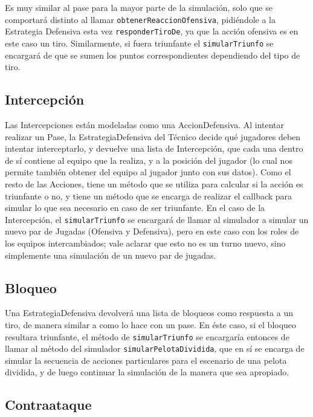 Es muy similar al pase para la mayor parte de la simulación, solo que se comportará distinto al llamar \texttt{obtenerReaccionOfensiva}, pidiéndole a la Estrategia Defensiva esta vez \texttt{responderTiroDe}, ya que la acción ofensiva es en este caso un tiro. Similarmente, si fuera triunfante el \texttt{simularTriunfo} se encargará de que se sumen los puntos correspondientes dependiendo del tipo de tiro.

\subsection{Intercepción}
Las Intercepciones están modeladas como una AccionDefensiva. Al intentar realizar un Pase, la EstrategiaDefensiva del Técnico decide qué jugadores deben intentar interceptarlo, y devuelve una lista de Intercepción, que cada una dentro de sí contiene al equipo que la realiza, y a la posición del jugador (lo cual nos permite también obtener del equipo al jugador junto con sus datos). Como el resto de las Acciones, tiene un método que se utiliza para calcular si la acción es triunfante o no, y tiene un método que se encarga de realizar el callback para simular lo que sea necesario en caso de ser triunfante. En el caso de la Intercepción, el \texttt{simularTriunfo} se encargará de llamar al simulador a simular un nuevo par de Jugadas (Ofensiva y Defensiva), pero en este caso con los roles de los equipos intercambiados; vale aclarar que esto no es un turno nuevo, sino simplemente una simulación de un nuevo par de jugadas.

\subsection{Bloqueo}
Una EstrategiaDefensiva devolverá una lista de bloqueos como respuesta a un tiro, de manera similar a como lo hace con un pase. En éste caso, si el bloqueo resultara triunfante, el método de \texttt{simularTriunfo} se encargaría entonces de llamar al método del simulador \texttt{simularPelotaDividida}, que en sí se encarga de simular la secuencia de acciones particulares para el escenario de una pelota dividida, y de luego continuar la simulación de la manera que sea apropiado.

\subsection{Contraataque}

